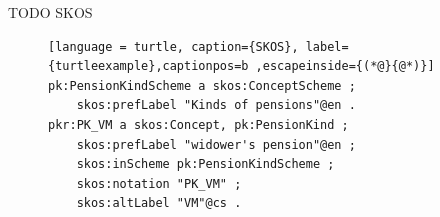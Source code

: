 TODO SKOS



\begin{figure}[h]
\begin{lstlisting}[language = turtle, caption={SKOS}, label={turtleexample},captionpos=b ,escapeinside={(*@}{@*)}]
pk:PensionKindScheme a skos:ConceptScheme ; 
    skos:prefLabel "Kinds of pensions"@en .
pkr:PK_VM a skos:Concept, pk:PensionKind ;
    skos:prefLabel "widower's pension"@en ;
    skos:inScheme pk:PensionKindScheme ;
    skos:notation "PK_VM" ;
    skos:altLabel "VM"@cs .
\end{lstlisting}
\end{figure}

